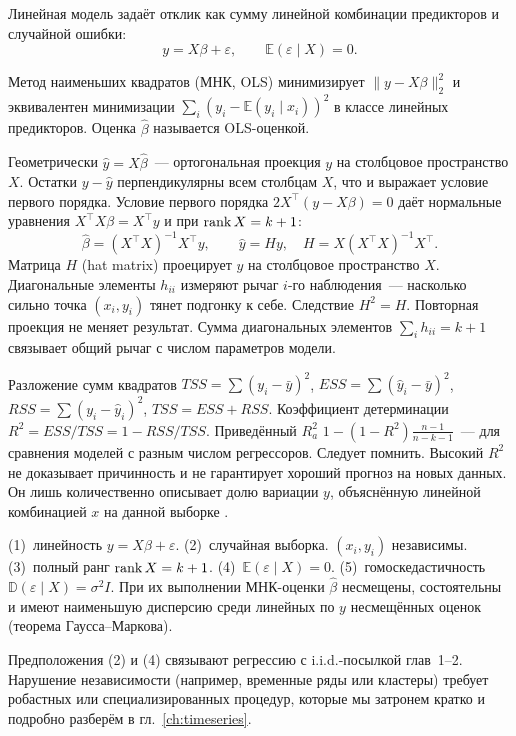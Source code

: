 \begin{definition}
Линейная модель задаёт отклик как сумму линейной комбинации предикторов и случайной ошибки:
\[ y = X\beta + \varepsilon, \qquad \mathbb{E}(\varepsilon\mid X)=0.
\]
\end{definition}

\begin{definition}
Метод наименьших квадратов (МНК, OLS) минимизирует $\|y-X\beta\|_2^2$ и эквивалентен минимизации $\sum_i (y_i-\mathbb{E}(y_i\mid x_i))^2$ в классе линейных предикторов. Оценка $\hat\beta$ называется OLS-оценкой.
\end{definition}

Геометрически $\hat y=X\hat\beta$~--- ортогональная проекция $y$ на столбцовое пространство $X$. Остатки $y-\hat y$ перпендикулярны всем столбцам $X$, что и выражает условие первого порядка.
Условие первого порядка $2X^\top(y-X\beta)=0$ даёт нормальные уравнения $X^\top X\beta=X^\top y$ и при $\operatorname{rank} X=k+1$:
\[ \hat\beta = (X^\top X)^{-1}X^\top y, \qquad \hat y = Hy, \quad H=X(X^\top X)^{-1}X^\top.
\]
Матрица $H$ (hat matrix) проецирует $y$ на столбцовое пространство $X$. Диагональные элементы $h_{ii}$ измеряют рычаг $i$-го наблюдения~--- насколько сильно точка $(x_i,y_i)$ тянет подгонку к себе.
Следствие $H^2=H$. Повторная проекция не меняет результат. Сумма диагональных элементов $\sum_i h_{ii}=k+1$ связывает общий рычаг с числом параметров модели.

Разложение сумм квадратов $TSS=\sum(y_i-\bar y)^2$, $ESS=\sum(\hat y_i-\bar y)^2$, $RSS=\sum(y_i-\hat y_i)^2$, $TSS=ESS+RSS$.
Коэффициент детерминации $R^2=ESS/TSS=1-RSS/TSS$.
Приведённый $R^2_a$ $1-(1-R^2)\frac{n-1}{n-k-1}$~--- для сравнения моделей с разным числом регрессоров.
Следует помнить. Высокий $R^2$ не доказывает причинность и не гарантирует хороший прогноз на новых данных. Он лишь количественно описывает долю вариации $y$, объяснённую линейной комбинацией $x$ на данной выборке \citep{casella2002}.

\begin{definition}
(1)~линейность $y=X\beta+\varepsilon$. (2)~случайная выборка. $(x_i,y_i)$ независимы. (3)~полный ранг $\operatorname{rank} X=k+1$. (4)~$\mathbb{E}(\varepsilon\mid X)=0$. (5)~гомоскедастичность $\mathbb{D}(\varepsilon\mid X)=\sigma^2 I$.
При их выполнении МНК-оценки $\hat\beta$ несмещены, состоятельны и имеют наименьшую дисперсию среди линейных по $y$ несмещённых оценок (теорема Гаусса--Маркова).
\end{definition}

Предположения (2) и (4) связывают регрессию с i.i.d.-посылкой глав~1--2. Нарушение независимости (например, временные ряды или кластеры) требует робастных или специализированных процедур, которые мы затронем кратко и подробно разберём в гл.~\ref{ch:timeseries}.

